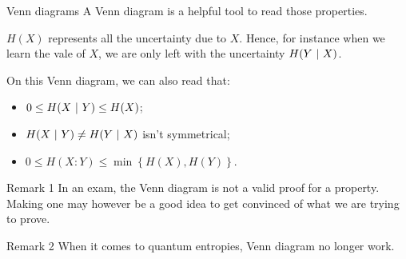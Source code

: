 \documentclass[a4paper]{article}
\begin{document}
\begin{parag}{Venn diagrams}
    A Venn diagram is a helpful tool to read those properties.

    $H\left(X\right)$ represents all the uncertainty due to $X$. Hence, for instance when we learn the vale of $X$, we are only left with the uncertainty $H\left(Y \suchthat X\right)$.

    On this Venn diagram, we can also read that:
    \begin{itemize}
        \item $0 \leq H\left(X \suchthat Y\right) \leq H\left(X\right)$;
        \item $H\left(X \suchthat Y\right) \neq H\left(Y \suchthat X\right)$ isn't symmetrical;
        \item $0 \leq H\left(X : Y\right) \leq \min\left\{H\left(X\right), H\left(Y\right)\right\}$.
    \end{itemize}

    \begin{subparag}{Remark 1}
        In an exam, the Venn diagram is not a valid proof for a property. Making one may however be a good idea to get convinced of what we are trying to prove.
    \end{subparag}

    \begin{subparag}{Remark 2}
        When it comes to quantum entropies, Venn diagram no longer work.
    \end{subparag}
\end{parag}
\end{document}
